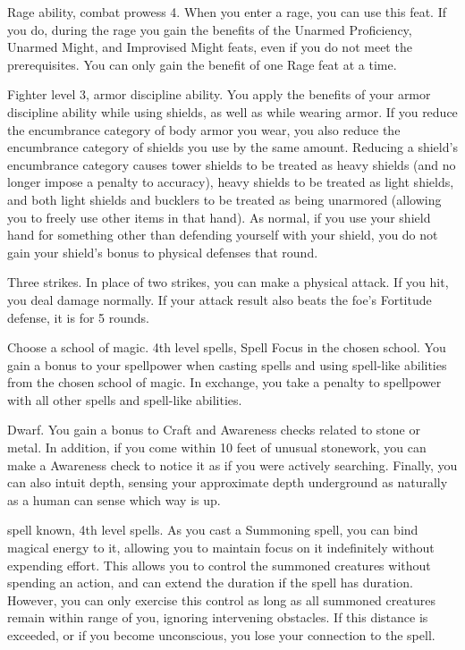 \featpres Rage ability, combat prowess 4.
\featben When you enter a rage, you can use this feat.
If you do, during the rage you gain the benefits of the Unarmed Proficiency, Unarmed Might, and Improvised Might feats, even if you do not meet the prerequisites.
 You can only gain the benefit of one Rage feat at a time.

\featpres Fighter level 3, armor discipline ability.
\featben You apply the benefits of your armor discipline ability while using shields, as well as while wearing armor.
If you reduce the encumbrance category of body armor you wear, you also reduce the encumbrance category of shields you use by the same amount.
Reducing a shield's encumbrance category causes tower shields to be treated as heavy shields (and no longer impose a  penalty to accuracy), heavy shields to be treated as light shields, and both light shields and bucklers to be treated as being unarmored (allowing you to freely use other items in that hand).
As normal, if you use your shield hand for something other than defending yourself with your shield, you do not gain your shield's bonus to physical defenses that round.

\featpre Three strikes.
\featben In place of two strikes, you can make a physical attack.
If you hit, you deal damage normally.
If your attack result also beats the foe's Fortitude defense, it is \staggered for 5 rounds.

Choose a school of magic.
\featpres 4th level spells, Spell Focus in the chosen school.
\featben You gain a  bonus to your spellpower when casting spells and using spell-like abilities from the chosen school of magic.
In exchange, you take a  penalty to spellpower with all other spells and spell-like abilities.

\featpre Dwarf.
\featben You gain a  bonus to Craft and Awareness checks related to stone or metal.
In addition, if you come within 10 feet of unusual stonework, you can make a Awareness check to notice it as if you were actively searching.
Finally, you can also intuit depth, sensing your approximate depth underground as naturally as a human can sense which way is up.

\featpres {} spell known, 4th level spells.
\featben As you cast a Summoning spell, you can bind magical energy to it, allowing you to maintain focus on it indefinitely without expending effort.
This allows you to control the summoned creatures without spending an action, and can extend the duration if the spell has \durshort duration.
However, you can only exercise this control as long as all summoned creatures remain within \rnglong range of you, ignoring intervening obstacles.
If this distance is exceeded, or if you become unconscious, you lose your connection to the spell.

